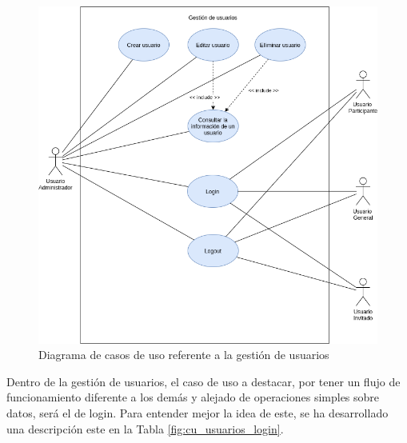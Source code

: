 \begin{figure}[h!]
    \centering
    \includegraphics[width=1\linewidth]{diseno/sistema/CU/usuarios.png}
    \caption{Diagrama de casos de uso referente a la gestión de usuarios}
    \label{fig:cu_usuarios}
\end{figure}

Dentro de la gestión de usuarios, el caso de uso a destacar, por tener un flujo de funcionamiento diferente a los demás y alejado de operaciones simples sobre datos, será el de login. Para entender mejor la idea de este, se ha desarrollado una descripción este en la Tabla \ref{fig:cu_usuarios_login}.


